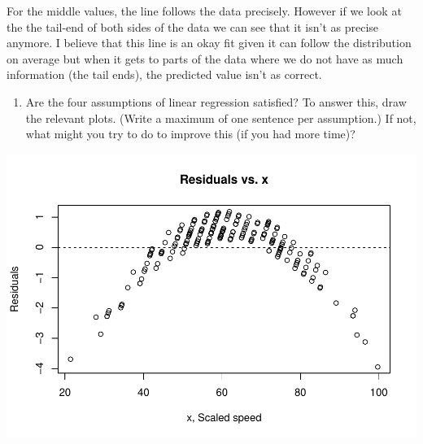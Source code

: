 \documentclass[
]{article}
\newenvironment{Shaded}{\begin{snugshade}}{\end{snugshade}}
\newcommand{\AttributeTok}[1]{\textcolor[rgb]{0.77,0.63,0.00}{#1}}
\newcommand{\DecValTok}[1]{\textcolor[rgb]{0.00,0.00,0.81}{#1}}
\newcommand{\FunctionTok}[1]{\textcolor[rgb]{0.00,0.00,0.00}{#1}}
\newcommand{\NormalTok}[1]{#1}
\newcommand{\SpecialCharTok}[1]{\textcolor[rgb]{0.00,0.00,0.00}{#1}}
\newcommand{\StringTok}[1]{\textcolor[rgb]{0.31,0.60,0.02}{#1}}
\providecommand{\tightlist}{%
  \setlength{\itemsep}{0pt}\setlength{\parskip}{0pt}}
\begin{document}
For the middle values, the line follows the data precisely. However if
we look at the the tail-end of both sides of the data we can see that it
isn't as precise anymore. I believe that this line is an okay fit given
it can follow the distribution on average but when it gets to parts of
the data where we do not have as much information (the tail ends), the
predicted value isn't as correct.

\begin{enumerate}
\def\labelenumi{\alph{enumi}.}
\setcounter{enumi}{3}
\tightlist
\item
  Are the four assumptions of linear regression satisfied? To answer
  this, draw the relevant plots. (Write a maximum of one sentence per
  assumption.) If not, what might you try to do to improve this (if you
  had more time)?
\end{enumerate}

\begin{Shaded}
\end{Shaded}

\includegraphics{Journal_files/figure-latex/unnamed-chunk-34-1.pdf}
\end{document}
